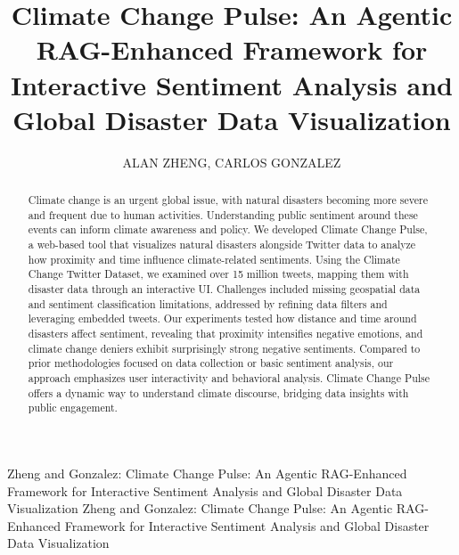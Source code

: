 \documentclass{ieeeaccess}
\begin{document}

\title{Climate Change Pulse: An Agentic RAG-Enhanced Framework for Interactive Sentiment Analysis and Global Disaster Data Visualization}

\author{\uppercase{Alan Zheng}, \uppercase{Carlos Gonzalez}}

\address[1]{West-Windsor Plainsboro High School North, Plainsboro Township, NJ 08536 USA (e-mail: alanzheng240@gmail.com)}
\address[2]{Computer Science Department, California State Polytechnic University, CA 91768 USA (e-mail: carlos01oscar@gmail.com)}


\markboth
{Zheng and Gonzalez: Climate Change Pulse: An Agentic RAG-Enhanced Framework for Interactive Sentiment Analysis and Global Disaster Data Visualization}
{Zheng and Gonzalez: Climate Change Pulse: An Agentic RAG-Enhanced Framework for Interactive Sentiment Analysis and Global Disaster Data Visualization}


\begin{abstract}
Climate change is an urgent global issue, with natural disasters becoming more severe and frequent due to human activities. Understanding public sentiment around these events can inform climate awareness and policy. We developed Climate Change Pulse, a web-based tool that visualizes natural disasters alongside Twitter data to analyze how proximity and time influence climate-related sentiments. Using the Climate Change Twitter Dataset, we examined over 15 million tweets, mapping them with disaster data through an interactive UI. Challenges included missing geospatial data and sentiment classification limitations, addressed by refining data filters and leveraging embedded tweets. Our experiments tested how distance and time around disasters affect sentiment, revealing that proximity intensifies negative emotions, and climate change deniers exhibit surprisingly strong negative sentiments. Compared to prior methodologies focused on data collection or basic sentiment analysis, our approach emphasizes user interactivity and behavioral analysis. Climate Change Pulse offers a dynamic way to understand climate discourse, bridging data insights with public engagement.
\end{abstract}
\end{document}
